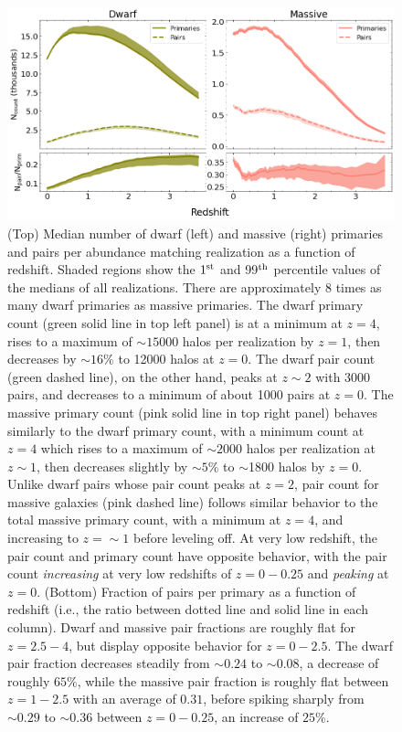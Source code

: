 \documentclass[twocolumn]{aastex631}
\begin{document}
  \begin{figure}[htb]
    \centering
    \includegraphics[width=\textwidth]{counts.png}
    \caption{(Top) Median number of dwarf (left) and massive (right) primaries and pairs per abundance matching realization as a function of redshift.
    Shaded regions show the $1^{\rm st}$ and 99$^{\rm th}$ percentile values of the medians of all realizations. 
    There are approximately 8 times as many dwarf primaries as massive primaries. 
    The dwarf primary count (green solid line in top left panel) is at a minimum at $z=4$, rises to a maximum of $\sim15000$ halos per realization by $z=1$, then decreases by $\sim16\%$ to 12000 halos at $z=0$. The dwarf pair count (green dashed line), on the other hand, peaks at $z\sim2$ with 3000 pairs, and decreases to a minimum of about 1000 pairs at $z=0$.
    The massive primary count (pink solid line in top right panel) behaves similarly to the dwarf primary count, with a minimum count at $z=4$ which rises to a maximum of $\sim2000$ halos per realization at $z\sim1$, then decreases slightly by $\sim5\%$ to $\sim$1800 halos by $z=0$. 
    Unlike dwarf pairs whose pair count peaks at $z=2$, pair count for massive galaxies (pink dashed line) follows similar behavior to the total massive primary count, with a minimum at $z=4$, and increasing to $z=\sim 1$ before leveling off. At very low redshift, the pair count and primary count have opposite behavior, with the pair count \textit{increasing} at very low redshifts of $z=0-0.25$ and \textit{peaking} at $z=0$.
    (Bottom) Fraction of pairs per primary as a function of redshift (i.e., the ratio between dotted line and solid line in each column). Dwarf and massive pair fractions are roughly flat for $z=2.5-4$, but display opposite behavior for $z=0-2.5$. The dwarf pair fraction decreases steadily from $\sim0.24$ to $\sim0.08$, a decrease of roughly $65\%$, while the massive pair fraction is roughly flat between $z=1-2.5$ with an average of $0.31$, before spiking sharply from $\sim 0.29$ to $\sim 0.36$ between $z=0-0.25$, an increase of $25\%$. 
      }
    \label{fig:counts}
  \end{figure}
\end{document}
